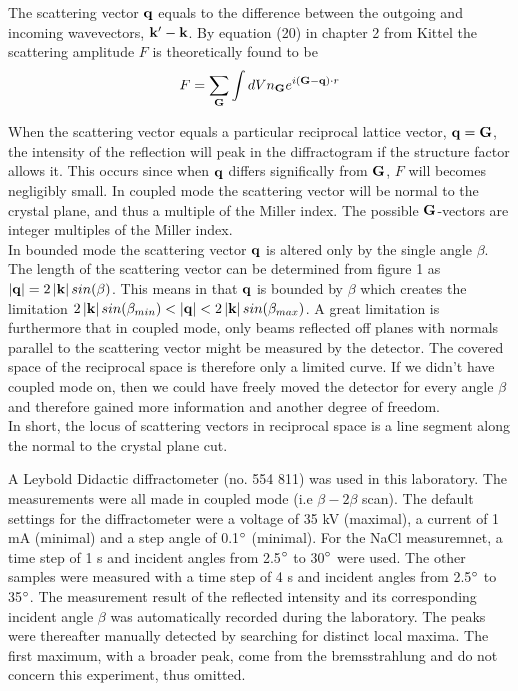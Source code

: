 \documentclass[a4paper,twoside=false,abstract=false,numbers=noenddot,
titlepage=false,headings=small,parskip=half,version=last]{scrartcl}
\begin{document}
The scattering vector $\bold{q}$ equals to the difference between the outgoing and incoming wavevectors,
$\bold{k}' - \bold{k}$. By equation (20) in chapter 2 from Kittel \cite{Kittel} the scattering
amplitude $F$ is theoretically found to be
\begin{equation}
    \label{eq:scatamp}
    F = \sum_\bold{G} \int dV n_{\bold{G}} e^{i(\bold{G}-\bold{q})\cdot r}
\end{equation}

When the scattering vector equals a particular reciprocal lattice vector, $\bold{q} = \bold{G}$, the intensity of the reflection will peak in the diffractogram if the structure factor allows it.
This occurs since when $\bold{q}$ differs significally from $\bold{G}$, $F$ will becomes negligibly small.
In coupled mode the scattering vector will be normal to the crystal plane, and thus a multiple of the Miller index. 
The possible $\bold{G}$-vectors are integer multiples of the Miller index.\\


In bounded mode the scattering vector $\bold{q}$ is altered only by the single angle $\beta$.
The length of the scattering vector can be determined from figure 1 as $\left\vert \bold{q} \right\vert = 2 \left\vert \bold{k} \right\vert sin(\beta)$.
This means in that $\bold{q}$ is bounded by $\beta$ which creates the limitation $2 \left\vert \bold{k} \right\vert sin(\beta_{min}) < \left\vert \bold{q} \right\vert < 2 \left\vert \bold{k} \right\vert sin(\beta_{max})$.
A great limitation is furthermore that in coupled mode, only beams reflected off planes with normals parallel to the scattering vector might be measured by the detector. The covered space of the reciprocal space is therefore only a limited curve.
If we didn't have coupled mode on, then we could have freely moved the detector for every angle $\beta$ and therefore gained more information and another degree of freedom.\\
In short, the locus of scattering vectors in reciprocal space is a line segment along the normal to the crystal plane cut.


A Leybold Didactic diffractometer (no. 554 811) was used in this laboratory.
The measurements were all made in coupled mode (i.e $\beta-2\beta$ scan).
The default settings for the diffractometer were a voltage of 35 kV (maximal), a current of 1 mA (minimal) and a step angle of 0.1$\degree$ (minimal).
For the NaCl measuremnet, a time step of 1 s and incident angles from 2.5$\degree$ to 30$\degree$ were used.
The other samples were measured with a time step of 4 s and incident angles from 2.5$\degree$ to 35$\degree$.
The measurement result of the reflected intensity and its corresponding incident angle $\beta$ was automatically recorded during the laboratory.
The peaks were thereafter manually detected by searching for distinct local maxima. The first maximum, with a broader peak, come from the bremsstrahlung and do not concern this experiment, thus omitted.
\end{document}
